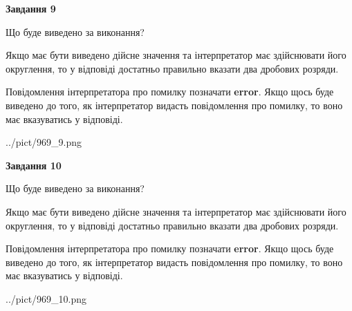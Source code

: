 \documentclass[12pt, ukrainian]{article}
\begin{document}
{\begin {Large}
{\begin {center}\textbf{Завдання 9}\end {center}}\par
Що буде виведено за виконання? \par

Якщо має бути виведено дійсне значення та інтерпретатор має здійснювати його округлення, 
то у відповіді достатньо правильно вказати два дробових розряди.

Повідомлення інтерпретатора про помилку позначати \textbf{error}.
Якщо щось буде виведено до того, як інтерпретатор видасть повідомлення про помилку, 
то воно має вказуватись у відповіді. \par

\begin{center}
	{../pict/969_9.png}
\end{center}
\newpage

{\begin {center}\textbf{Завдання 10}\end {center}}\par
Що буде виведено за виконання? \par

Якщо має бути виведено дійсне значення та інтерпретатор має здійснювати його округлення, 
то у відповіді достатньо правильно вказати два дробових розряди.

Повідомлення інтерпретатора про помилку позначати \textbf{error}.
Якщо щось буде виведено до того, як інтерпретатор видасть повідомлення про помилку, 
то воно має вказуватись у відповіді. \par

\begin{center}
	{../pict/969_10.png}
\end{center}
\newpage

\end {Large}}
\end{document}

